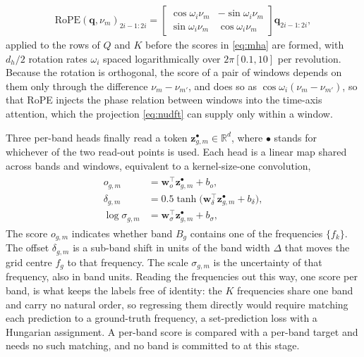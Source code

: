 \documentclass[journal,onecolumn]{IEEEtran}
\begin{document}
\begin{eqnarray}
\label{eq:rope}
\mathrm{RoPE}(\mathbf{q},\nu_m)_{2i-1:2i}=
\begin{bmatrix}\cos\omega_i\nu_m & -\sin\omega_i\nu_m\\ \sin\omega_i\nu_m & \cos\omega_i\nu_m\end{bmatrix}
\mathbf{q}_{2i-1:2i},
\end{eqnarray}
applied to the rows of $Q$ and $K$ before the scores in \eqref{eq:mha} are formed, with $d_h/2$ rotation rates $\omega_i$ spaced logarithmically over $2\pi[0.1,10]$ per revolution. Because the rotation is orthogonal, the score of a pair of windows depends on them only through the difference $\nu_m-\nu_{m'}$, and does so as $\cos\omega_i(\nu_m-\nu_{m'})$, so that RoPE injects the phase relation between windows into the time-axis attention, which the projection \eqref{eq:nudft} can supply only within a window.

Three per-band heads finally read a token $\mathbf{z}^{\bullet}_{g,m}\in\mathbb{R}^{d}$, where $\bullet$ stands for whichever of the two read-out points is used. Each head is a linear map shared across bands and windows, equivalent to a kernel-size-one convolution,
\begin{eqnarray}
\label{eq:heads}
\begin{aligned}
o_{g,m}&=\mathbf{w}_o^\top\mathbf{z}^{\bullet}_{g,m}+b_o, \\
\delta_{g,m}&=0.5\tanh\big(\mathbf{w}_\delta^\top\mathbf{z}^{\bullet}_{g,m}+b_\delta\big), \\
\log\sigma_{g,m}&=\mathbf{w}_\sigma^\top\mathbf{z}^{\bullet}_{g,m}+b_\sigma,
\end{aligned}
\end{eqnarray}
The score $o_{g,m}$ indicates whether band $B_g$ contains one of the frequencies $\{f_k\}$. The offset $\delta_{g,m}$ is a sub-band shift in units of the band width $\Delta$ that moves the grid centre $f_g$ to that frequency. The scale $\sigma_{g,m}$ is the uncertainty of that frequency, also in band units. Reading the frequencies out this way, one score per band, is what keeps the labels free of identity: the $K$ frequencies share one band and carry no natural order, so regressing them directly would require matching each prediction to a ground-truth frequency, a set-prediction loss with a Hungarian assignment. A per-band score is compared with a per-band target and needs no such matching, and no band is committed to at this stage.
\end{document}
